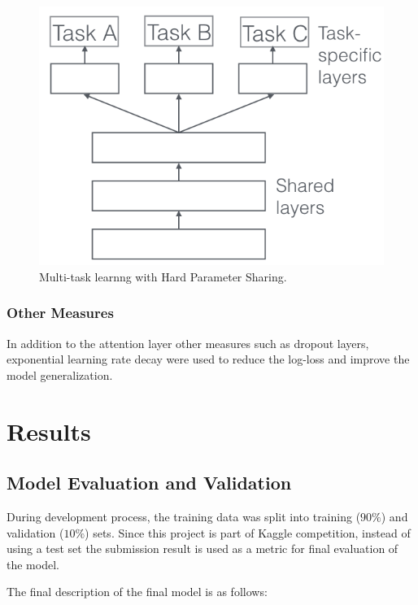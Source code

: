 \documentclass{article}
\begin{document}
        \begin{figure}
            \centering
            \includegraphics[scale=0.4]{mtl.png}
            \caption{Multi-task learnng with Hard Parameter Sharing.}
            \label{fig:mtl}
        \end{figure}

    \subsubsection{Other Measures}

    In addition to the attention layer other measures such as dropout layers, exponential learning rate decay were used to reduce the log-loss and improve the model generalization. 


\section{Results}

    \subsection{Model Evaluation and Validation}

    During development process, the training data was split into training ($90\%$) and validation ($10\%$) sets. Since this project is part of Kaggle competition, instead of using a test set the submission result is used as a metric for final evaluation of the model.

    The final description of the final model is as follows:
\end{document}
